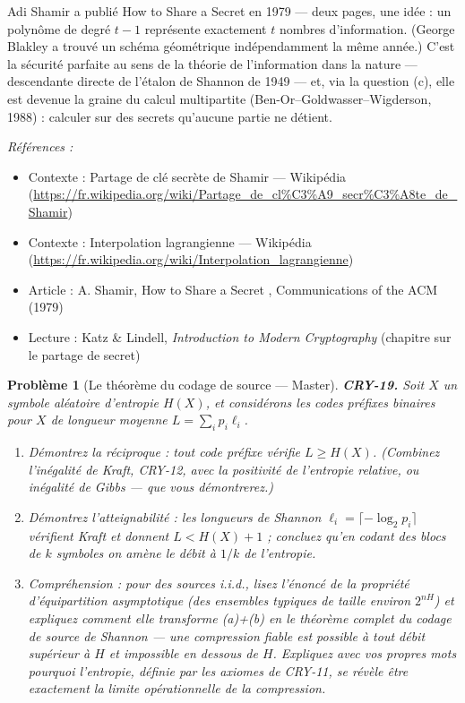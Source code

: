 \documentclass[11pt]{article}
\newtheorem{problem}{Problème}
\newenvironment{refs}{\par\small\noindent\emph{Références :}\begin{itemize}\setlength\itemsep{0pt}}{\end{itemize}\normalsize}
\begin{document}
\noindent Adi Shamir a publié \og{} How to Share a Secret \fg{} en 1979 --- deux pages, une
idée : un polynôme de degré $t-1$ représente exactement $t$ nombres d'information.
(George Blakley a trouvé un schéma géométrique indépendamment la même année.) C'est la
sécurité parfaite au sens de la théorie de l'information dans la nature --- descendante
directe de l'étalon de Shannon de 1949 --- et, via la question (c), elle est devenue la graine
du calcul multipartite (Ben-Or--Goldwasser--Wigderson, 1988) : calculer sur des secrets
qu'aucune partie ne détient.

\begin{refs}
\item Contexte : Partage de clé secrète de Shamir --- Wikipédia (\url{https://fr.wikipedia.org/wiki/Partage_de_cl%C3%A9_secr%C3%A8te_de_Shamir})
\item Contexte : Interpolation lagrangienne --- Wikipédia (\url{https://fr.wikipedia.org/wiki/Interpolation_lagrangienne})
\item Article : A. Shamir, \og{} How to Share a Secret \fg{}, Communications of the ACM (1979)
\item Lecture : Katz \& Lindell, \textit{Introduction to Modern Cryptography} (chapitre sur le partage de secret)
\end{refs}

\bigskip

\begin{problem}[{Le théorème du codage de source --- Master}]
\textbf{CRY-19.} Soit $X$ un symbole aléatoire d'entropie
$H(X)$, et considérons les codes préfixes binaires pour $X$ de longueur moyenne
$L = \sum_i p_i \ell_i$.
\begin{enumerate}
\item[(a)] Démontrez la réciproque : tout code préfixe vérifie
$L \ge H(X)$. (Combinez l'inégalité de Kraft, CRY-12, avec la positivité de l'entropie
relative, ou inégalité de Gibbs --- que vous démontrerez.)
\item[(b)] Démontrez l'atteignabilité :
les longueurs de Shannon $\ell_i = \lceil -\log_2 p_i \rceil$ vérifient Kraft et donnent
$L < H(X) + 1$ ; concluez qu'en codant des blocs de $k$ symboles on amène le débit à
$1/k$ de l'entropie.
\item[(c)] Compréhension : pour des sources i.i.d., lisez l'énoncé de la
propriété d'équipartition asymptotique (des ensembles typiques de taille environ
$2^{nH}$) et expliquez comment elle transforme (a)+(b) en le théorème complet du codage de
source de Shannon --- une compression fiable est possible à tout débit supérieur à $H$ et
impossible en dessous de $H$. Expliquez avec vos propres mots pourquoi l'entropie, définie
par les axiomes de CRY-11, se révèle être exactement la limite opérationnelle de la
compression.
\end{enumerate}

\end{problem}
\end{document}
